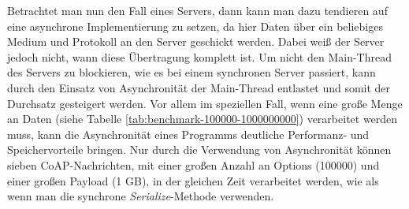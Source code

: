Betrachtet man nun den Fall eines Servers, dann kann man dazu tendieren auf eine asynchrone Implementierung zu setzen, da hier Daten über ein beliebiges Medium und Protokoll an den Server geschickt werden. Dabei weiß der Server jedoch nicht, wann diese Übertragung komplett ist. Um nicht den Main-Thread des Servers zu blockieren, wie es bei einem synchronen Server passiert, kann durch den Einsatz von Asynchronität der Main-Thread entlastet und somit der Durchsatz gesteigert werden. Vor allem im speziellen Fall, wenn eine große Menge an Daten (siehe Tabelle \ref{tab:benchmark-100000-1000000000}) verarbeitet werden muss, kann die Asynchronität eines Programms deutliche Performanz- und Speichervorteile bringen. Nur durch die Verwendung von Asynchronität können sieben CoAP-Nachrichten, mit einer großen Anzahl an Options (100000) und einer großen Payload (1 GB), in der gleichen Zeit verarbeitet werden, wie als wenn man die synchrone \textit{Serialize}-Methode verwenden.
